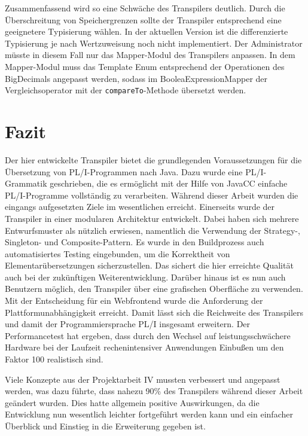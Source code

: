 Zusammenfassend wird so eine Schwäche des Transpilers deutlich. Durch die Überschreitung von Speichergrenzen sollte der Transpiler entsprechend eine geeignetere Typisierung wählen. In der aktuellen Version ist die differenzierte Typisierung je nach Wertzuweisung noch nicht implementiert. Der Administrator müsste in diesem Fall nur das Mapper-Modul des Transpilers anpassen. In dem Mapper-Modul muss das Template Enum entsprechend der Operationen des BigDecimals angepasst werden, sodass im BooleaExpressionMapper der Vergleichsoperator mit der \verb+compareTo+-Methode übersetzt werden.
\pagebreak

\section{Fazit}
Der hier entwickelte Transpiler bietet die grundlegenden Voraussetzungen für die Übersetzung von PL/I-Programmen nach Java. Dazu wurde eine PL/I-Grammatik geschrieben, die es \newline ermöglicht  mit der Hilfe von JavaCC einfache PL/I-Programme vollständig zu verarbeiten. Während dieser Arbeit wurden die eingangs aufgesetzten Ziele im wesentlichen erreicht. 
Einerseits wurde der Transpiler in einer modularen Architektur entwickelt. Dabei haben sich mehrere Entwurfsmuster als nützlich erwiesen,
namentlich die Verwendung der Strategy-, Singleton- und Composite-Pattern.
Es wurde in den Buildprozess auch automatisiertes Testing eingebunden, um die Korrektheit von Elementarübersetzungen sicherzustellen. Das sichert die hier erreichte Qualität auch bei der zukünftigen Weiterentwicklung.
Darüber hinaus ist es nun auch Benutzern möglich, den Transpiler über eine grafischen Oberfläche zu verwenden.
Mit der Entscheidung für ein Webfrontend wurde die Anforderung der Plattformunabhängigkeit erreicht. Damit lässt sich die Reichweite des Transpilers und damit der Programmiersprache PL/I insgesamt erweitern.
Der Performancetest hat ergeben, dass durch den Wechsel auf leistungsschwächere Hardware bei der Laufzeit rechenintensiver Anwendungen Einbußen um den Faktor 100 realistisch sind.

Viele Konzepte aus der Projektarbeit IV mussten verbessert und angepasst werden, was dazu führte, dass nahezu 90\% des Transpilers
während dieser Arbeit geändert wurden. Dies hatte allgemein positive Auswirkungen, da die Entwicklung nun wesentlich leichter fortgeführt werden kann
und ein einfacher Überblick und Einstieg in die Erweiterung gegeben ist.

